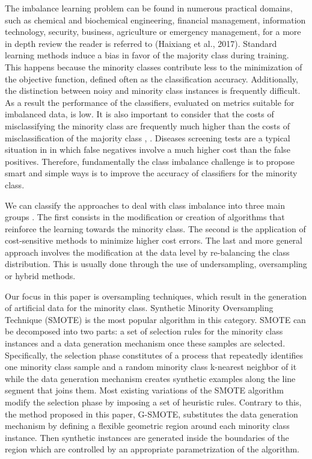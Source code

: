 \documentclass[parskip=full]{scrartcl}
\begin{document}
The imbalance learning problem can be found in numerous practical domains, such as chemical and biochemical engineering, financial management, information technology, security, business, agriculture or emergency management, for a more in depth review the reader is referred to (Haixiang et al., 2017). Standard learning methods induce a bias in favor of the majority class during training. This happens because the minority classes contribute less to the minimization of the objective function, defined often as the classification accuracy. Additionally, the distinction between noisy and minority class instances is frequently difficult. As a result the performance of the classifiers, evaluated on metrics suitable for imbalanced data, is low. It is also important to consider that the costs of misclassifying the minority class are frequently much higher than the costs of misclassification of the majority class  \cite{Domingos1999}, \cite{Ting2002}. Diseases screening tests are a typical situation in in which false negatives involve a much higher cost than the false positives. Therefore, fundamentally the class imbalance challenge is to propose smart and simple ways is to improve the accuracy of classifiers for the minority class.

We can classify the approaches to deal with class imbalance into three main groups \cite{Fernandez2013}. The first consists in the modification or creation of algorithms that reinforce the learning towards the minority class. The second is the application of cost-sensitive methods to minimize higher cost errors. The last and more general approach involves the modification at the data level by re-balancing the class distribution. This is usually done through the use of undersampling, oversampling or hybrid methods.

Our focus in this paper is oversampling techniques, which result in the generation of artificial data for the minority class. Synthetic Minority Oversampling Technique (SMOTE) \cite{Chawla2002} is the most popular algorithm in this category. SMOTE can be decomposed into two parts: a set of selection rules for the minority class instances and a data generation mechanism once these samples are selected. Specifically, the selection phase constitutes of a process that repeatedly identifies one minority class sample and a random minority class k-nearest neighbor of it while the data generation mechanism creates synthetic examples along the line segment that joins them. Most existing variations of the SMOTE algorithm modify the selection phase by imposing a set of heuristic rules. Contrary to this, the method proposed in this paper, G-SMOTE, substitutes the data generation mechanism by defining a flexible geometric region around each minority class instance. Then synthetic instances are generated inside the boundaries of the region which are controlled by an appropriate parametrization of the algorithm.
\end{document}
